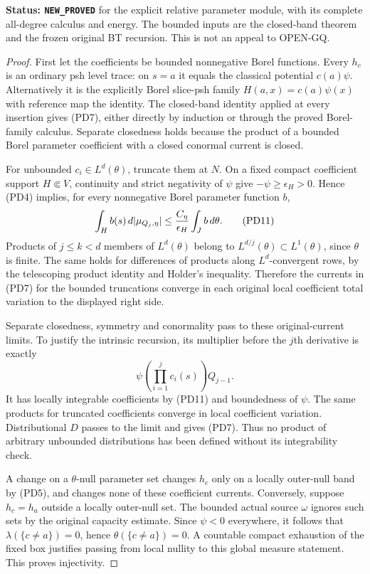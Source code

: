 \noindent\textbf{Status: \texttt{NEW\_PROVED}} for the
explicit relative parameter module, with its complete
all-degree calculus and energy. The bounded inputs are
the closed-band theorem and the frozen original BT
recursion. This is not an appeal to OPEN-GQ.

\begin{proof}
First let the coefficients be bounded nonnegative Borel
functions. Every $h_c$ is an ordinary psh level trace:
on $s=a$ it equals the classical potential $c(a)\psi$.
Alternatively it is the explicitly Borel slice-psh family
$H(a,x)=c(a)\psi(x)$ with reference map the identity.
The closed-band identity applied at every insertion gives
(PD7), either directly by induction or through the proved
Borel-family calculus. Separate closedness holds because
the product of a bounded Borel parameter coefficient with
a closed conormal current is closed.

For unbounded $c_i\in L^d(\theta)$, truncate them at $N$.
On a fixed compact coefficient support $H\Subset V$,
continuity and strict negativity of $\psi$ give
$-\psi\geq\epsilon_H>0$. Hence (PD4) implies, for every
nonnegative Borel parameter function $b$,
\[
 \int_H b(s)\,d|\mu_{Q_j,\eta}|
       \leq {C_\eta\over\epsilon_H}\int_J b\,d\theta.
 \tag{PD11}
\]
Products of $j\leq k<d$ members of $L^d(\theta)$ belong
to $L^{d/j}(\theta)\subset L^1(\theta)$, since $\theta$
is finite. The same holds for differences of products
along $L^d$-convergent rows, by the telescoping product
identity and Holder's inequality. Therefore the currents
in (PD7) for the bounded truncations converge in each
original local coefficient total variation to the
displayed right side.

Separate closedness, symmetry and conormality pass to
these original-current limits. To justify the intrinsic
recursion, its multiplier before the $j$th derivative
is exactly
\[
             \psi\left(\prod_{i=1}^j c_i(s)\right)Q_{j-1}.
\]
It has locally integrable coefficients by (PD11) and
boundedness of $\psi$. The same products for truncated
coefficients converge in local coefficient variation.
Distributional $D$ passes to the limit and gives (PD7).
Thus no product of arbitrary unbounded distributions has
been defined without its integrability check.

A change on a $\theta$-null parameter set changes $h_c$
only on a locally outer-null band by (PD5), and changes
none of these coefficient currents. Conversely, suppose
$h_c=h_a$ outside a locally outer-null set. The bounded
actual source $\omega$ ignores such sets by the original
capacity estimate. Since $\psi<0$ everywhere, it follows
that $\lambda(\{c\ne a\})=0$, hence
$\theta(\{c\ne a\})=0$. A countable compact exhaustion
of the fixed box justifies passing from local nullity
to this global measure statement. This proves injectivity.


\end{proof}
